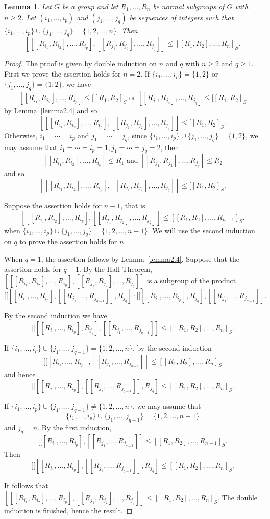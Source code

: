 \documentclass[10pt]{amsart}
\newtheorem{lem}[thm]{Lemma}
\numberwithin{equation}{section}
\begin{document}
\begin{lem}\label{lemma2.5}
Let $G$ be a group and let $R_1,\ldots,R_n$ be normal subgroups of $G$ with $n\geq 2$. Let $(i_1,\ldots,i_p)$ and $(j_1,\ldots,j_q)$ be sequences of integers such that $\{i_1,\ldots,i_p\}\cup\{j_1,\ldots,j_q\}=\{1,2,\ldots,n\}$. Then
$$
[[[R_{i_1},R_{i_2}],\ldots,R_{i_p}],[[R_{j_1},R_{j_2}],\ldots,R_{j_q}]]\leq [[R_1,R_2],\ldots,R_n]_S.
$$
\end{lem}
\begin{proof}
The proof is given by double induction on $n$ and $q$ with $n\geq 2$ and $q\geq 1$. First we prove the assertion holds for $n=2$. If  $\{i_1,\ldots,i_p\}=\{1,2\}$
or $\{j_1,\ldots,j_q\}=\{1,2\}$, we have
$$
[[R_{i_1},R_{i_2}],\ldots,R_{i_p}]\leq [[R_1,R_2]_S \textrm{ or }[[R_{j_1},R_{j_2}],\ldots,R_{j_q}]\leq [[R_1,R_2]_S$$
by Lemma~\ref{lemma2.4}  and so  $$
[[[R_{i_1},R_{i_2}],\ldots,R_{i_p}],[[R_{j_1},R_{j_2}],\ldots,R_{j_q}]]\leq [[R_1,R_2]_S.
$$
Otherwise, $i_1=\cdots=i_p$ and $j_1=\cdots=j_q $, since  $\{i_1,\ldots,i_p\}\cup\{j_1,\ldots,j_q\}=\{1,2\}$, we may assume that  $i_1=\cdots=i_p=1, j_1=\cdots=j_q =2$, then $$[[R_{i_1},R_{i_2}],\ldots,R_{i_p}]\leq R_1 \textrm{ and }[[R_{j_1},R_{j_2}],\ldots,R_{j_q}]\leq R_2$$ and so
 $$
[[[R_{i_1},R_{i_2}],\ldots,R_{i_p}],[[R_{j_1},R_{j_2}],\ldots,R_{j_q}]]\leq [[R_1,R_2]_S.
$$

Suppose the assertion holds for $n-1$, that is $$
[[[R_{i_1},R_{i_2}],\ldots,R_{i_p}],[[R_{j_1},R_{j_2}],\ldots,R_{j_q}]]\leq [[R_1,R_2],\ldots,R_{n-1}]_S.
$$ when $\{i_1,\ldots,i_p\}\cup\{j_1,\ldots,j_q\}=\{1,2,\ldots,n-1\}$. We will use the second induction on $q$ to prove the assertion holds for $n$.

When $q=1$, the assertion follows by Lemma~\ref{lemma2.4}. Suppose that the assertion holds for $q-1$. By the Hall Theorem, $[[[R_{i_1},R_{i_2}],\ldots,R_{i_p}],[[R_{j_1},R_{j_2}],\ldots,R_{j_q}]]$ is a subgroup of the product
$$
[[[[R_{i_1},\ldots,R_{i_p}],[[R_{j_1},\ldots,R_{j_{q-1}}]],R_{j_q}]\cdot [[[[R_{i_1},\ldots,R_{i_p}],R_{j_q}],[[R_{j_1},\ldots,R_{j_{q-1}}]].
$$

By the second induction we have $$ [[[[R_{i_1},\ldots,R_{i_p}],R_{j_q}],[[R_{j_1},\ldots,R_{j_{q-1}}]]\leq [[R_1,R_2],\ldots,R_n]_S.$$

If $\{i_1,\ldots,i_p\}\cup\{j_1,\ldots,j_{q-1}\}=\{1,2,\ldots,n\}$, by the second induction $$[[[R_{i_1},\ldots,R_{i_p}],[[R_{j_1},\ldots,R_{j_{q-1}}]]\leq [[R_1,R_2],\ldots,R_n]_S$$ and hence $$[[[[R_{i_1},\ldots,R_{i_p}],[[R_{j_1},\ldots,R_{j_{q-1}}]],R_{j_q}]\leq [[R_1,R_2],\ldots,R_n]_S. $$

If $\{i_1,\ldots,i_p\}\cup\{j_1,\ldots,j_{q-1}\}\neq \{1,2,\ldots,n\}$, we may assume that  $$\{i_1,\ldots,i_p\}\cup\{j_1,\ldots,j_{q-1}\}=\{1,2,\ldots,n-1\}$$ and $j_q=n$. By the first induction, $$[[[R_{i_1},\ldots,R_{i_p}],[[R_{j_1},\ldots,R_{j_{q-1}}]]\leq [[R_1,R_2],\ldots,R_{n-1}]_S.$$
Then $$[[[[R_{i_1},\ldots,R_{i_p}],[[R_{j_1},\ldots,R_{j_{q-1}}]],R_{j_q}]\leq [[R_1,R_2],\ldots,R_n]_S.$$

It follows that $[[[R_{i_1},R_{i_2}],\ldots,R_{i_p}],[[R_{j_1},R_{j_2}],\ldots,R_{j_q}]]\leq [[R_1,R_2],\ldots,R_n]_S$. The double induction is finished, hence the result.
\end{proof}
\end{document}
